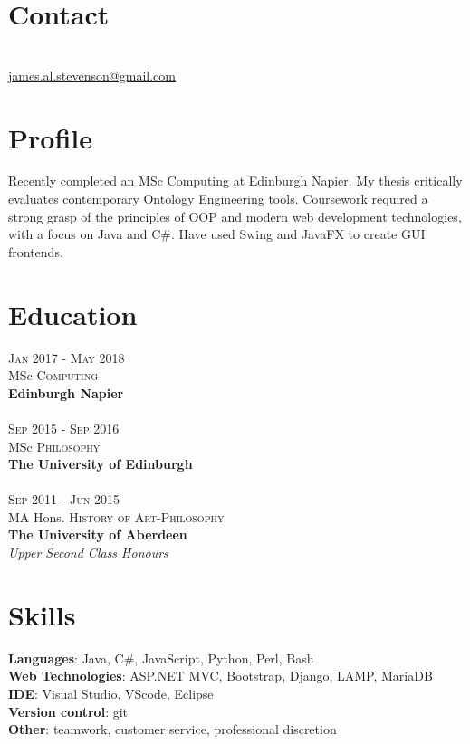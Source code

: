 \documentclass[12pt, a4paper]{article}
\begin{document}
\par{\bigskip\par}
\section{Contact}
\large{}\\
\href{mailto:james.al.stevenson@gmail.com}{james.al.stevenson@gmail.com}\\

\begin{multicols}{2}

\section{Profile}
Recently completed an MSc Computing at Edinburgh Napier.
My thesis critically evaluates contemporary Ontology Engineering tools.
Coursework required a strong grasp of the principles of OOP and modern web development technologies, with a focus on Java and C\#.
Have used Swing and JavaFX to create GUI frontends.

\section{Education}
\textsc{Jan} 2017 - \textsc{May} 2018\\
MSc \textsc{Computing} \\
\textbf{Edinburgh Napier}\\~\\
\textsc{Sep} 2015 - \textsc{Sep} 2016\\
MSc \textsc{Philosophy} \\ 
\textbf{The University of Edinburgh}\\~\\
\textsc{Sep} 2011 - \textsc{Jun} 2015\\
MA Hons. \textsc{History of Art}-\textsc{Philosophy}\\ 
\textbf{The University of Aberdeen}\\ 
\small\emph{Upper Second Class Honours}\\

\section{Skills}
\large{
\textbf{Languages}: Java, C\#, JavaScript, Python, Perl, Bash\\
\textbf{Web Technologies}: ASP.NET MVC, Bootstrap, Django, LAMP, MariaDB\\
\textbf{IDE}: Visual Studio, VScode, Eclipse\\
\textbf{Version control}: git\\
\textbf{Other}: teamwork, customer service, professional discretion\\}


\end{multicols}
\end{document}
